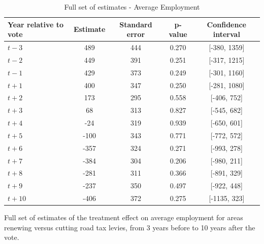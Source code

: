 \begin{table}[htbp]
    \centering
    \caption{Full set of estimates - Average Employment}
    \label{tab:average_employment}
    \begin{tabular}{lcccc}
        \hline
        Year relative to vote & Estimate & Standard error & p-value & Confidence interval \\
        \hline
        $t - 3$  & 489   & 444  & 0.270  & [-380, 1359] \\
        $t - 2$  & 449   & 391  & 0.251  & [-317, 1215] \\
        $t - 1$  & 429   & 373  & 0.249  & [-301, 1160] \\
        $t + 1$ & 400   & 347  & 0.250  & [-281, 1080] \\
        $t + 2$ & 173   & 295  & 0.558  & [-406, 752] \\
        $t + 3$ & 68    & 313  & 0.827  & [-545, 682] \\
        $t + 4$ & -24   & 319  & 0.939  & [-650, 601] \\
        $t + 5$ & -100  & 343  & 0.771  & [-772, 572] \\
        $t + 6$ & -357  & 324  & 0.271  & [-993, 278] \\
        $t + 7$ & -384  & 304  & 0.206  & [-980, 211] \\
        $t + 8$ & -281  & 311  & 0.366  & [-891, 329] \\
        $t + 9$ & -237  & 350  & 0.497  & [-922, 448] \\
        $t + 10$ & -406  & 372  & 0.275  & [-1135, 323] \\
        \hline
    \end{tabular}
    \begin{tablenotes}
        \small
        \item Full set of estimates of the treatment effect on average employment for areas renewing versus cutting road tax levies, from 3 years before to 10 years after the vote.
    \end{tablenotes}
\end{table}



